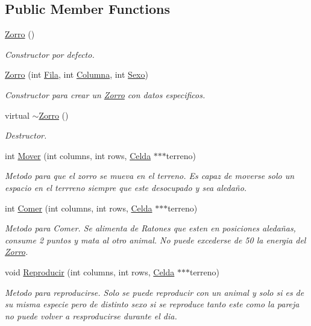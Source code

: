 \subsection*{Public Member Functions}
\begin{DoxyCompactItemize}
\item 
\hyperlink{classZorro_adb6072a36faa243b1c185ec3e566f556}{Zorro} ()
\begin{DoxyCompactList}\small\item\em Constructor por defecto. \end{DoxyCompactList}\item 
\hyperlink{classZorro_a16f7f378084d2fa795750d1ff824ca76}{Zorro} (int \hyperlink{classAnimal_ab403adfd13b57143eff123bdd6a2febb}{Fila}, int \hyperlink{classAnimal_a340d64e6e4ffe5f35e0855c63aad1bd3}{Columna}, int \hyperlink{classAnimal_a42b629ae5a7e0c05263a3f6e592ea116}{Sexo})
\begin{DoxyCompactList}\small\item\em Constructor para crear un \hyperlink{classZorro}{Zorro} con datos especificos. \end{DoxyCompactList}\item 
virtual \hyperlink{classZorro_a73fe75fd4746a9347da559ffaa741842}{$\sim$\+Zorro} ()
\begin{DoxyCompactList}\small\item\em Destructor. \end{DoxyCompactList}\item 
int \hyperlink{classZorro_a2facc3ce009fc8d46ff7cbd93370c06b}{Mover} (int columns, int rows, \hyperlink{classCelda}{Celda} $\ast$$\ast$$\ast$terreno)
\begin{DoxyCompactList}\small\item\em Metodo para que el zorro se mueva en el terreno. Es capaz de moverse solo un espacio en el terrreno siempre que este desocupado y sea aledaño. \end{DoxyCompactList}\item 
int \hyperlink{classZorro_aff938c6cbfac969d13261481b6cb4976}{Comer} (int columns, int rows, \hyperlink{classCelda}{Celda} $\ast$$\ast$$\ast$terreno)
\begin{DoxyCompactList}\small\item\em Metodo para Comer. Se alimenta de Ratones que esten en posiciones aledañas, consume 2 puntos y mata al otro animal. No puede excederse de 50 la energia del \hyperlink{classZorro}{Zorro}. \end{DoxyCompactList}\item 
void \hyperlink{classZorro_a22664badacda98773684a81b0c6c29a0}{Reproducir} (int columns, int rows, \hyperlink{classCelda}{Celda} $\ast$$\ast$$\ast$terreno)
\begin{DoxyCompactList}\small\item\em Metodo para reproducirse. Solo se puede reproducir con un animal y solo si es de su misma especie pero de distinto sexo si se reproduce tanto este como la pareja no puede volver a resproducirse durante el dia. \end{DoxyCompactList}\end{DoxyCompactItemize}
